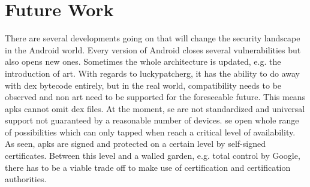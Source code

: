 \section{Future Work}\label{section:conclusion-future}
There are several developments going on that will change the security landscape in the Android world.
\newline
\newline
Every version of Android closes several vulnerabilities but also opens new ones.
Sometimes the whole architecture is updated, e.g. the introduction of \gls{art}.
With regards to \gls{luckypatcherg}, it has the ability to do away with dex bytecode entirely, but in the real world, compatibility needs to be observed and non \gls{art} need to be supported for the foreseeable future.
This means \gls{apk}s cannot omit \gls{dex} files.
\newline
\newline
At the moment, \gls{se} are not standardized and universal support not guaranteed by a reasonable number of devices.
\gls{se} open whole range of possibilities which can only tapped when reach a critical level of availability.
\newline
\newline
As seen, \gls{apk}s are signed and protected on a certain level by self-signed certificates.
Between this level and a walled garden, e.g. total control by Google, there has to be a viable trade off to make use of certification and certification authorities.

